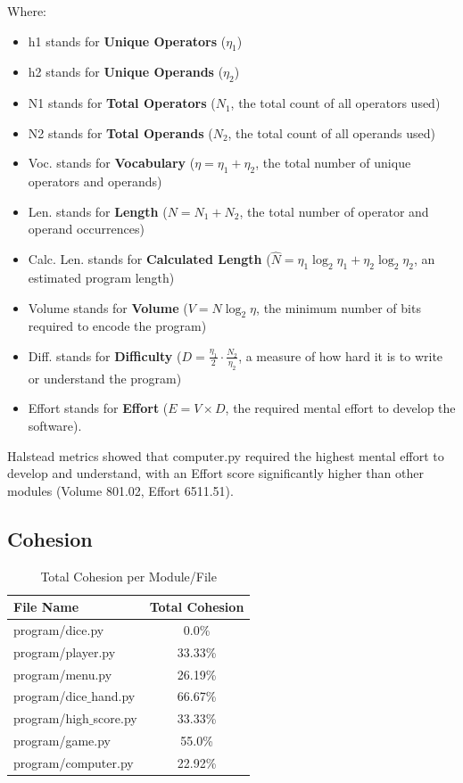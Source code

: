 \documentclass{article}
\begin{document}
Where:
\begin{itemize}
    \item h1 stands for \textbf{Unique Operators} ($\eta_1$)
    \item h2 stands for \textbf{Unique Operands} ($\eta_2$)
    \item N1 stands for \textbf{Total Operators} ($N_1$, the total count of all operators used)
    \item N2 stands for \textbf{Total Operands} ($N_2$, the total count of all operands used)
    \item Voc. stands for \textbf{Vocabulary} ($\eta = \eta_1 + \eta_2$, the total number of unique operators and operands)
    \item Len. stands for \textbf{Length} ($N = N_1 + N_2$, the total number of operator and operand occurrences)
    \item Calc. Len. stands for \textbf{Calculated Length} ($\hat{N} = \eta_1 \log_2 \eta_1 + \eta_2 \log_2 \eta_2$, an estimated program length)
    \item Volume stands for \textbf{Volume} ($V = N \log_2 \eta$, the minimum number of bits required to encode the program)
    \item Diff. stands for \textbf{Difficulty} ($D = \frac{\eta_1}{2} \cdot \frac{N_2}{\eta_2}$, a measure of how hard it is to write or understand the program)
    \item Effort stands for \textbf{Effort} ($E = V \times D$, the required mental effort to develop the software).
\end{itemize}

Halstead metrics showed that computer.py required the highest mental effort to develop and understand, with an Effort score significantly higher than other modules (Volume 801.02, Effort 6511.51).

\subsection{Cohesion}

\begin{table}[H]
    \centering
    \caption{Total Cohesion per Module/File}
    \label{tab:module_cohesion}
    \begin{tabular}{|l|c|}
        \hline
        \textbf{File Name}       & \textbf{Total Cohesion} \\ \hline
        program/dice.py          & 0.0\%                   \\ \hline
        program/player.py        & 33.33\%                 \\ \hline
        program/menu.py          & 26.19\%                 \\ \hline
        program/dice$\_$hand.py  & 66.67\%                 \\ \hline
        program/high$\_$score.py & 33.33\%                 \\ \hline
        program/game.py          & 55.0\%                  \\ \hline
        program/computer.py      & 22.92\%                 \\ \hline
    \end{tabular}
\end{table}
\end{document}
